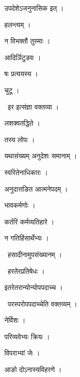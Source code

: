 \documentclass[10pt, openany, oneside]{book}
\begin{document}
\noindent उपदेशेऽजनुनासिक इत् ।

\noindent हलन्त्यम् ।

\noindent न विभक्तौ तुस्माः ।

\noindent आदिर्ञिटुडवः ।

\noindent षः प्रत्ययस्य ।

\noindent चुटू ।

\par\noindent\hspace{1.5em}{\vps वा॰}~{\qt इर इत्संज्ञा वक्तव्या ।}

\noindent लशक्वतद्धिते ।

\noindent तस्य लोपः ।

\noindent यथासंख्यम् अनुदेशः समानाम् ।

\noindent स्वरितेनाधिकारः ।

\noindent अनुदात्तङित आत्मनेपदम् ।

\noindent भावकर्मणोः ।

\noindent कर्तरि कर्मव्यतिहारे ।

\noindent न गतिहिंसार्थेभ्यः ।

\par\noindent\hspace{1.5em}{\vps वा॰}~{\qt हसादीनामुपसंख्यानम् ।}

\par\noindent\hspace{1.5em}{\vps वा॰}~{\qt हरतेरप्रतिषेधः ।}

\noindent इतरेतरान्योन्योपपदाच्च ।

\par\noindent\hspace{1.5em}{\vps वा॰}~{\qt परस्परोपपदाच्चेति वक्तव्यम् ।}

\noindent नेर्विशः ।

\noindent परिव्यवेभ्यः क्रियः ।

\noindent विपराभ्यां जेः ।

\noindent आङो दोऽनास्यविहरणे ।
\end{document}
